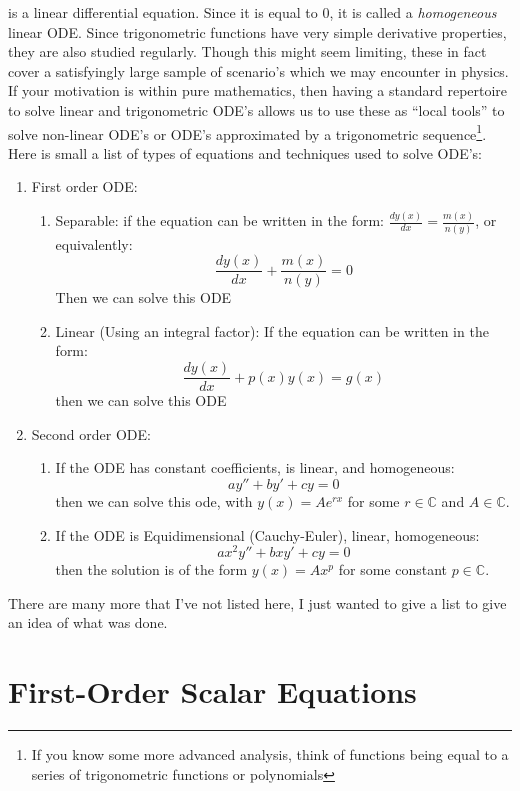 \documentclass{book}
\newcommand{\C}{{\mathbb{C}}}
\begin{document}
is a linear differential equation. Since it is equal to $0$, it is called a \emph{homogeneous} linear ODE. Since
trigonometric functions have very simple derivative properties, they are also studied regularly. Though this might seem
limiting, these in fact cover a satisfyingly large sample of scenario's which we may encounter in physics. If your
motivation is within pure mathematics, then having a standard repertoire to solve linear and trigonometric ODE's allows
us to use these as ``local tools'' to solve non-linear ODE's or ODE's approximated by a trigonometric
sequence\footnote{If you know some more advanced analysis, think of functions being equal to a series of
trigonometric functions or polynomials}. Here is small a list of types of equations and techniques used to solve ODE's:

\begin{enumerate}
	\item First order ODE:
	\begin{enumerate}
		 \item Separable: if the equation can be written in the form: $\frac{dy(x)}{dx} = \frac{m(x)}{n(y)}$, or equivalently:
			  	\[
			  		\frac{dy(x)}{dx} + \frac{m(x)}{n(y)} = 0
			  	\]
			  	Then we can solve this ODE
			  \item Linear (Using an integral factor): If the equation can be written in the form:
			  	\[
			  		\frac{dy(x)}{dx} + p(x)y(x) = g(x)
			  	\]
			  	then we can solve this ODE
	\end{enumerate}
	\item Second order ODE:
		\begin{enumerate}
			\item If the ODE has constant coefficients, is linear, and homogeneous:
				\[
					ay'' + by' + cy  =0
			\]
			then we can solve this ode, with $y(x) = Ae^{rx}$ for some $r \in \C$ and $A \in \C$.
		\item If the ODE is Equidimensional (Cauchy-Euler), linear, homogeneous:
			\[
				ax^2y'' + bxy' + cy  =0
			\]
			then the solution is of the form $y(x) = Ax^p$ for some constant $p \in \C$.
		\end{enumerate}
\end{enumerate}

There are many more that I've not listed here, I just wanted to give a list to give an idea of what was done.

\chapter{First-Order Scalar Equations}\label{cha:firstOrderODE}
\end{document}
